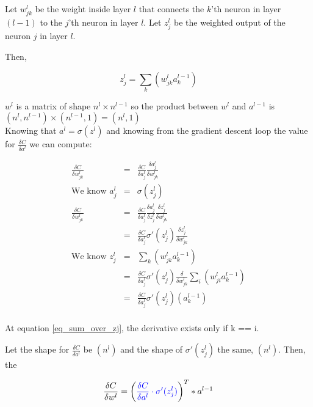 \documentclass{article}
\begin{document}
Let $w_{jk}^{l}$ be the weight inside layer $l$ that connects the $k$'th neuron in layer $(l-1)$ to the
$j$'th neuron in layer $l$. Let $z^l_j$ be the weighted output of the neuron $j$ in layer $l$.

Then, 

\begin{equation}
	z_j^l = \sum_{k}\left( w_{jk}^l a^{l-1}_k  \right)
\end{equation}

$w^l$ is a matrix of shape $n^l \times n^{l-1}$ so the product between $w^l$ and $a^{l-1}$ is  $(n^l, n^{l-1}) \times (n^{l-1}, 1) = (n^l, 1)$\\

Knowing that $a^l{=}\sigma (z^l)$ and knowing from the gradient descent loop the value for  $\frac{\delta C}{\delta a^l}$ we can compute:

\begin{eqnarray}
	\frac{\delta C}{\delta w^l_{jk}} &=& \frac{\delta C}{\delta a^l_j} \frac{\delta a^l_j}{\delta w^l_{jk}} \label{eq_dCost_dWeight}	 \\
	\text{We know } a^l_j&=&\sigma (z^l_j) \\
	\frac{\delta C}{\delta w^l_{jk}} &=&\frac{\delta C}{\delta a^l_j} \frac{\delta a^l_j}{\delta z^l_j} \frac{\delta z^l_j} {\delta w^l_{jk}}\\
	&=&\frac{\delta C}{\delta a^l_j} \sigma ' (z^l_j) \frac{\delta z^l_j} {\delta w^l_{jk}}\\
	\text{We know } z_j^l &=& \sum_{k}\left( w_{jk}^l a^{l-1}_k  \right)\\
	\label{eq_sum_over_zj}
	&=&\frac{\delta C}{\delta a^l_j} \sigma ' (z^l_j) \frac{\delta} {\delta w^l_{jk}}  \sum_{i}\left( w_{ji}^l a^{l-1}_k  \right) \\
	&=&\frac{\delta C}{\delta a^l_j} \sigma ' (z^l_j) \left(a^{l-1}_k \right) \\
\end{eqnarray}

At equation \eqref{eq_sum_over_zj}, the derivative exists only if k == i. 

Let the shape for $\frac{\delta C}{\delta a^l}$ be $(n^{l})$ and the shape of $\sigma ' (z^l_j)$ the same, $(n^{l})$. Then, the

\begin{equation}
	\frac{\delta C}{\delta w^l} = \left( \textcolor{blue}{\frac{\delta C}{\delta a^l} \cdot \sigma ' (z^l_j)} \right)^T * a^{l-1}
\end{equation}
\end{document}
